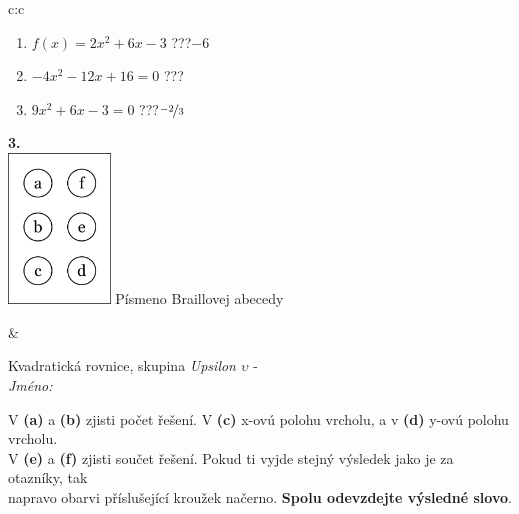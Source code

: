 \documentclass[10pt]{report}
\begin{document}
\begin{tabular}{c:c}
\begin{minipage}[c][104.5mm][t]{0.5\linewidth}
\begin{center}
\begin{minipage}{0.79\linewidth}
\begin{center}
\begin{varwidth}{\linewidth}
\begin{enumerate}
\item $f(x)=2x^2+6x-3$\quad \dotfill\; ???\;\dotfill \quad $-6$
\item $-4x^2-12x+16=0$\quad \dotfill\; ???\;\dotfill {}
\item $9x^2+6x-3=0$\quad \dotfill\; ???\;\dotfill \quad $\nicefrac{-2}{3}$
\end{enumerate}
\end{varwidth}
\end{center}
\end{minipage}
\begin{minipage}{0.20\linewidth}
\begin{center}
{\Huge\bfseries 3.} \\[2mm]
\includegraphics[height=40mm]{../images/braille.png}
{\small Písmeno Braillovej abecedy}
\end{center}
\end{minipage}
\end{center}
\end{minipage}
&
\begin{minipage}[c][104.5mm][t]{0.5\linewidth}
\begin{center}
\vspace{7mm}
{\huge Kvadratická rovnice, skupina \textit{Upsilon $\upsilon$} -}\\[5mm]
\textit{Jméno:}\phantom{xxxxxxxxxxxxxxxxxxxxxxxxxxxxxxxxxxxxxxxxxxxxxxxxxxxxxxxxxxxxxxxxx}\\[5mm]
\begin{minipage}{0.95\linewidth}
\begin{center}
V \textbf{(a)} a \textbf{(b)} zjisti počet řešení. V \textbf{(c)} x-ovú polohu vrcholu, a v \textbf{(d)} y-ovú polohu vrcholu.\\V \textbf{(e)} a \textbf{(f)} zjisti součet řešení. Pokud ti vyjde stejný výsledek jako je za otazníky, tak\\napravo obarvi příslušející kroužek načerno. \textbf{Spolu odevzdejte výsledné slovo}.
\end{center}
\end{minipage}
\\[1mm]

\end{center}
\end{minipage}
\end{tabular}
\end{document}
